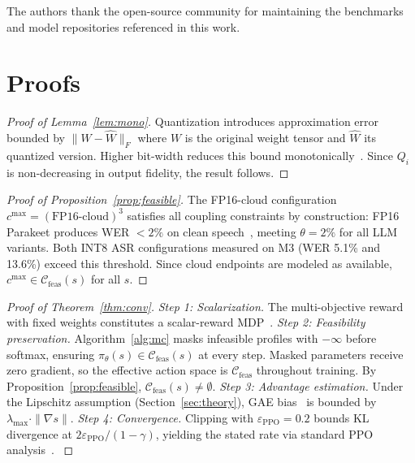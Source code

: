 \documentclass{article}
\begin{document}
The authors thank the open-source community for maintaining the benchmarks and model repositories referenced in this work. 




\appendix

\section{Proofs}
\label{app:proofs}

\begin{proof}[Proof of Lemma~\ref{lem:mono}]
Quantization introduces approximation error bounded by $\|W - \hat{W}\|_F$ where $W$ is the original weight tensor and $\hat{W}$ its quantized version. Higher bit-width reduces this bound monotonically~\citep{dettmers2022llmint8,han2016deep,nagel2020datafree}. Since $Q_i$ is non-decreasing in output fidelity, the result follows.
\end{proof}

\begin{proof}[Proof of Proposition~\ref{prop:feasible}]
The FP16-cloud configuration $c^{\max}=(\text{FP16-cloud})^3$ satisfies all coupling constraints by construction: FP16 Parakeet produces WER $<2\%$ on clean speech~\citep{parakeet2025}, meeting $\theta = 2\%$ for all LLM variants. Both INT8 ASR configurations measured on M3 (WER 5.1\% and 13.6\%) exceed this threshold. Since cloud endpoints are modeled as available, $c^{\max}\in\mathcal{C}_{\text{feas}}(s)$ for all $s$.
\end{proof}

\begin{proof}[Proof of Theorem~\ref{thm:conv}]
\emph{Step 1: Scalarization.} The multi-objective reward with fixed weights constitutes a scalar-reward MDP~\citep{hayes2022morl}. \emph{Step 2: Feasibility preservation.} Algorithm~\ref{alg:mc} masks infeasible profiles with $-\infty$ before softmax, ensuring $\pi_\theta(s)\in\mathcal{C}_{\text{feas}}(s)$ at every step. Masked parameters receive zero gradient, so the effective action space is $\mathcal{C}_{\text{feas}}$ throughout training. By Proposition~\ref{prop:feasible}, $\mathcal{C}_{\text{feas}}(s)\neq\emptyset$. \emph{Step 3: Advantage estimation.} Under the Lipschitz assumption (Section~\ref{sec:theory}), GAE bias~\citep{schulman2016gae} is bounded by $\lambda_{\max}\cdot\|\nabla s\|$. \emph{Step 4: Convergence.} Clipping with $\varepsilon_{\text{PPO}}=0.2$ bounds KL divergence at $2\varepsilon_{\text{PPO}}/(1-\gamma)$, yielding the stated rate via standard PPO analysis~\citep{schulman2017ppo}. \label{eq:eps_bound}
\end{proof}
\end{document}
